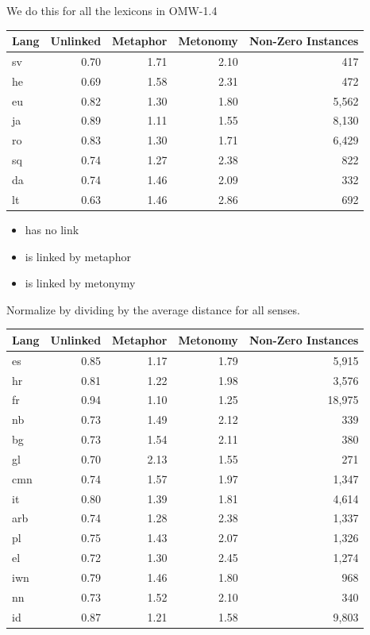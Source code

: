 \documentclass[dvipsnames]{beamer}
\begin{document}
\begin{frame}[allowframebreaks]{We do this for all the lexicons in OMW-1.4}

 
  \begin{center}
  \begin{tabular}{lrrrr}
    Lang & Unlinked & Metaphor & Metonomy & Non-Zero Instances \\ \hline
sv & 0.70 & 1.71 & 2.10 & 417   \\
he & 0.69 & 1.58 & 2.31 & 472   \\
eu & 0.82 & 1.30 & 1.80 & 5,562  \\
ja & 0.89 & 1.11 & 1.55 & 8,130 \\
ro & 0.83 & 1.30 & 1.71 & 6,429 \\
sq & 0.74 & 1.27 & 2.38 & 822 \\
da & 0.74 & 1.46 & 2.09 & 332 \\
lt & 0.63 & 1.46 & 2.86 & 692 \\
 \end{tabular}
\end{center}

\begin{itemize}
\item {} has no link
\item {} is linked by metaphor
\item {} is linked by metonymy
\end{itemize}
Normalize by dividing  by the average distance for all senses.

  \begin{center}
  \begin{tabular}{lrrrr}
    Lang & Unlinked & Metaphor & Metonomy & Non-Zero Instances \\ \hline
es & 0.85 & 1.17 & 1.79 & 5,915 \\
 hr & 0.81 & 1.22 & 1.98 & 3,576 \\
    fr & 0.94 & 1.10 & 1.25 & 18,975 \\
nb & 0.73 & 1.49 & 2.12 & 339 \\
bg & 0.73 & 1.54 & 2.11 & 380 \\
gl & 0.70 & 2.13 & 1.55 & 271 \\
cmn & 0.74 & 1.57 & 1.97 & 1,347 \\
it & 0.80 & 1.39 & 1.81 & 4,614 \\
arb & 0.74 & 1.28 & 2.38 & 1,337 \\
pl & 0.75 & 1.43 & 2.07 & 1,326 \\
el & 0.72 & 1.30 & 2.45 & 1,274 \\
iwn & 0.79 & 1.46 & 1.80 & 968 \\
nn & 0.73 & 1.52 & 2.10 & 340 \\
id & 0.87 & 1.21 & 1.58 & 9,803 \\
  \end{tabular}
\end{center}


\end{frame}
\end{document}
